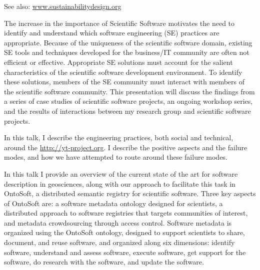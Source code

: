 \documentclass[a4paper,UKenglish]{dagrep}
\begin{document}
See also: \url{www.sustainabilitydesign.org}


The increase in the importance of Scientific Software motivates the need to identify and understand which software engineering (SE) practices are appropriate. Because of the uniqueness of the scientific software domain, existing SE tools and techniques developed for the business/IT community are often not efficient or effective. Appropriate SE solutions must account for the salient characteristics of the scientific software development environment. To identify these solutions, members of the SE community must interact with members of the scientific software community. This presentation will discuss the findings from a series of case studies of scientific software projects, an ongoing workshop series, and the results of interactions between my research group and scientific software projects.


In this talk, I describe the engineering practices, both social and
technical, around the \href{yt project}{http://yt-project.org}.  I describe the
positive aspects and the failure modes, and how we have attempted to
route around these failure modes.




In this talk I provide an overview of the current state of the art for software description in geosciences, along with our approach to facilitate this task in OntoSoft, a distributed semantic registry for scientific software. Three key aspects of OntoSoft are: a software metadata ontology designed for scientists, a distributed approach to software registries that targets communities of interest, and metadata crowdsourcing through access control. Software metadata is organized using the OntoSoft ontology, designed to support scientists to share, document, and reuse software, and organized along six dimensions: identify software, understand and assess software, execute software, get support for the software, do research with the software, and update the software.
\end{document}
